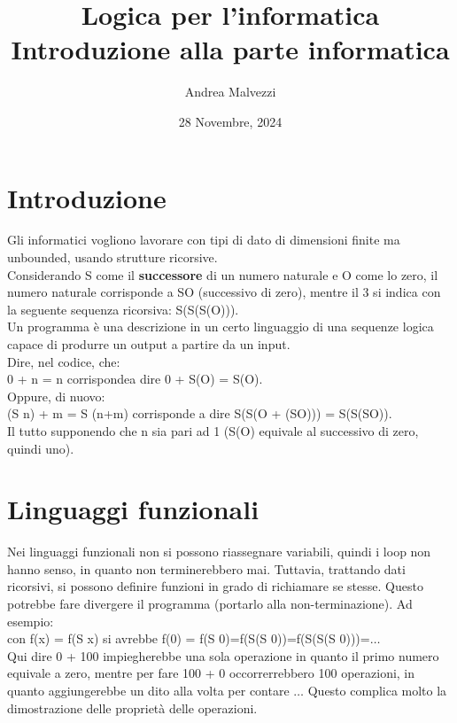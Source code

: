 \documentclass[12pt]{article}
\author{Andrea Malvezzi}
\title{\textbf{Logica per l'informatica\\Introduzione alla parte informatica}}
\date{28 Novembre, 2024}
\begin{document}
\maketitle
\pagebreak
\tableofcontents
\pagebreak

\section{Introduzione}
Gli informatici vogliono lavorare con tipi di dato di dimensioni finite ma unbounded, usando strutture ricorsive.
\\
Considerando S come il \textbf{successore} di un numero naturale e O come lo zero,
il numero naturale corrisponde a SO (successivo di zero),
mentre il 3 si indica con la seguente sequenza ricorsiva: S(S(S(O))).
\\
Un programma è una descrizione in un certo linguaggio di una sequenze logica capace di produrre un output a partire da un input.
\\
Dire, nel codice, che:
\\
0 + n = n corrispondea dire 0 + S(O) = S(O).
\\
Oppure, di nuovo:
\\
(S n) + m = S (n+m) corrisponde a dire S(S(O + (SO))) = S(S(SO)).
\\
Il tutto supponendo che n sia pari ad 1 (S(O) equivale al successivo di zero, quindi uno).

\section{Linguaggi funzionali}
Nei linguaggi funzionali non si possono riassegnare variabili, quindi i loop non hanno senso,
in quanto non terminerebbero mai.
Tuttavia, trattando dati ricorsivi, si possono definire funzioni in grado di richiamare se stesse.
Questo potrebbe fare divergere il programma (portarlo alla non-terminazione).
Ad esempio:
\\
con f(x) = f(S x) si avrebbe f(0) = f(S 0)=f(S(S 0))=f(S(S(S 0)))=$\dots$
\\
Qui dire 0 + 100 impiegherebbe una sola operazione in quanto il primo numero equivale a zero, mentre per fare 100 + 0 occorrerrebbero 100 operazioni, in quanto aggiungerebbe un dito alla volta per contare $\dots$ Questo complica molto la dimostrazione delle proprietà delle operazioni.
\end{document}
